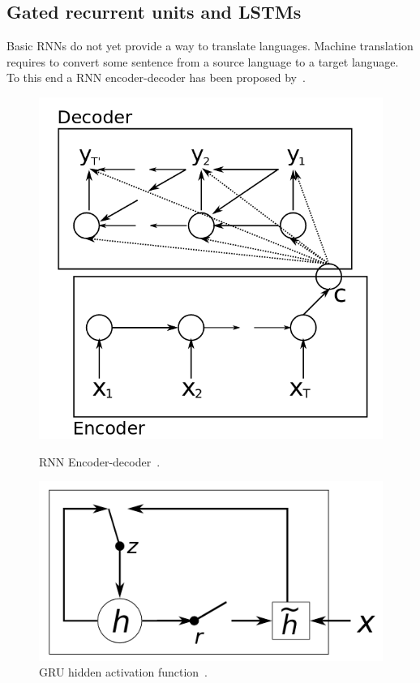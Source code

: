 \subsection{Gated recurrent units and LSTMs}
\label{subsec:gru}
Basic RNNs do not yet provide a way to translate languages.
Machine translation requires to convert some sentence from a source language to a target language.
To this end a RNN encoder-decoder has been proposed by~\citet{cho2014learning}.

\begin{figure}
    \centering
    \begin{minipage}{0.48\textwidth}
        \includegraphics[width=\textwidth]{figures/encoder_decoder.png}
        \caption{RNN Encoder-decoder~\cite[Figure 1]{cho2014learning}.}
    \label{fig:encoder_decoder}
    \end{minipage}
    \hspace*{3mm}
    \begin{minipage}{0.48\textwidth}
        \includegraphics[width=\textwidth]{figures/gru.png}
        \caption{GRU hidden activation function~\cite[Figure 2]{cho2014learning}.}
    \label{fig:gru}
    \end{minipage}
\end{figure}

